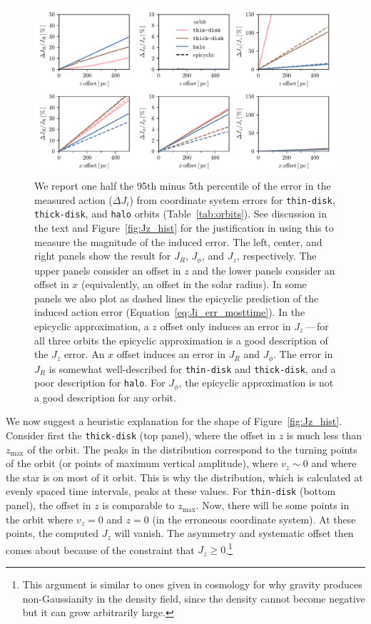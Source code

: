 \documentclass[twocolumn]{aastex62}
\newcommand{\thin}{\texttt{thin-disk}}
\newcommand{\thick}{\texttt{thick-disk}}
\newcommand{\halo}{\texttt{halo}}
\begin{document}
\begin{figure}[htb!]
\begin{center}
\includegraphics[width=\textwidth]{fig/schmactions_many_orbits.pdf}
\end{center}
\caption{We report one half the 95th minus 5th percentile of the error
in the measured action ($\Delta J_i$) from coordinate system errors for
\thin{}, \thick{}, and \halo{} orbits (Table~\ref{tab:orbits}). See discussion in the
text and Figure~\ref{fig:Jz_hist} for the justification in using this to measure the magnitude of the
induced error. The left, center, and right panels show the result for $J_R$,
$J_{\phi}$, and $J_z$, respectively. The upper panels consider an offset in
$z$ and the lower panels consider an offset in $x$ (equivalently, an offset in
the solar radius). In some panels we also plot as dashed lines the epicyclic
prediction of the induced action error (Equation~\eqref{eq:Ji_err_mosttime}).
In the epicyclic approximation, a $z$ offset only induces an error in $J_z$\,---\,for all three orbits the epicyclic approximation is a good description of
the $J_z$ error. An $x$ offset induces an error in $J_R$ and $J_{\phi}$. The
error in $J_R$ is somewhat well-described for \thin{} and \thick{},
and a poor description for \halo{}. For $J_{\phi}$, the
epicyclic approximation is not a good description for any orbit.}
\label{fig:many_orbit_wrong_ref}
\end{figure}

We now suggest a heuristic explanation for
the shape of Figure~\ref{fig:Jz_hist}.
Consider first the \thick{} (top panel), where the offset in $z$ is
much less than $z_{\text{max}}$ of the orbit. The peaks in the distribution
correspond to the turning points of the orbit (or points of maximum vertical
amplitude), where $v_z \sim 0$ and where the star is on most of it orbit. This
is why the distribution, which is calculated at evenly spaced time intervals, peaks at these values. For \thin{}
(bottom panel), the offset in $z$ is comparable to $z_{\text{max}}$. Now,
there will be some points in the orbit where $v_z = 0$ and $z=0$ (in the
erroneous coordinate system). At these points, the computed $J_z$
will vanish. The asymmetry and systematic offset then comes about because of
the constraint that $J_z \geq 0$.\footnote{This argument is similar to ones given in
cosmology for why gravity produces non-Gaussianity in the density field, since
the density cannot become negative but it can grow arbitrarily large.}
\end{document}
